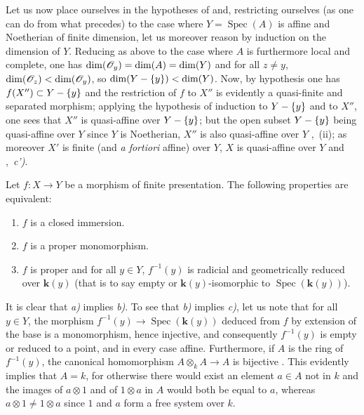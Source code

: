Let us now place ourselves in the hypotheses of  and, restricting ourselves (as one can do from what precedes) to the case where $Y=\operatorname{Spec}(A)$ is affine and Noetherian of finite dimension, let us moreover reason by induction on the dimension of $Y$.
Reducing as above to the case where $A$ is furthermore local and complete, one has $\dim(\mathscr{O}_y)=\dim(A)=\dim(Y)$ and for all $z\neq y$, $\dim(\mathscr{O}_z)<\dim(\mathscr{O}_y)$, so $\dim(Y-\{y\})<\dim(Y)$.
Now, by hypothesis one has $f(X'')\subset Y-\{y\}$ and the restriction of $f$ to $X''$ is evidently a quasi-finite and separated morphism; applying the hypothesis of induction to $Y-\{y\}$ and to $X''$, one sees that $X''$ is quasi-affine over $Y-\{y\}$; but the open subset $Y-\{y\}$ being quasi-affine over $Y$ since $Y$ is Noetherian, $X''$ is also quasi-affine over $Y$ ,~(ii); as moreover $X'$ is finite (and \emph{a fortiori} affine) over $Y$, $X$ is quasi-affine over $Y$  and ,~\emph{c')}.

\begin{proposition}[8.11.5]
\label{IV.8.11.5}
Let $f:X\to Y$ be a morphism of finite presentation.
The following properties are equivalent:
\begin{enumerate}[label=\emph{\alph*)}]
  \item $f$ is a closed immersion.
  \item $f$ is a proper monomorphism.
  \item $f$ is proper and for all $y\in Y$, $f^{-1}(y)$ is radicial and geometrically reduced over $\boldsymbol{k}(y)$ (that is to say empty or $\boldsymbol{k}(y)$-isomorphic to $\operatorname{Spec}(\boldsymbol{k}(y))$).
\end{enumerate}
\end{proposition}

It is clear that \emph{a)} implies \emph{b)}.
To see that \emph{b)} implies \emph{c)}, let us note  that for all $y\in Y$, the morphism $f^{-1}(y)\to\operatorname{Spec}(\boldsymbol{k}(y))$ deduced from $f$ by extension of the base is a monomorphism, hence injective, and consequently $f^{-1}(y)$ is empty or reduced to a point, and in every case affine.
Furthermore, if $A$ is the ring of $f^{-1}(y)$, the canonical homomorphism $A\otimes_k A\to A$ is bijective .
This evidently implies that $A=k$, for otherwise there would exist an element $a\in A$ not in $k$ and the images of $a\otimes 1$ and of $1\otimes a$ in $A$ would both be equal to $a$, whereas $a\otimes 1\neq1\otimes a$ since $1$ and $a$ form a free system over $k$.

